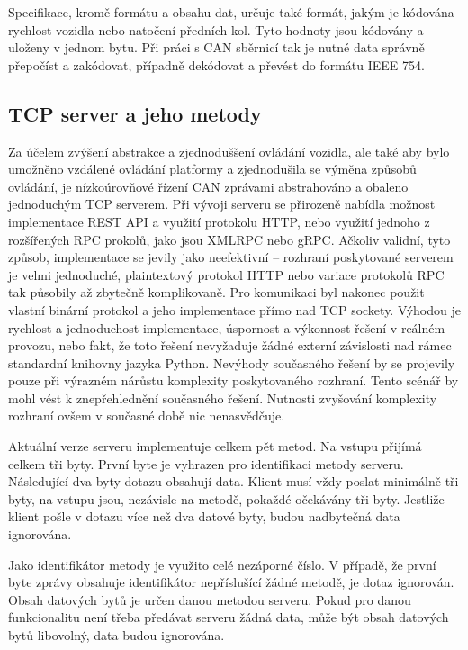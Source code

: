 \documentclass[czech,bachelor,dept460,male,cpp,cpdeclaration]{diploma}
\begin{document}
Specifikace, kromě formátu a obsahu dat, určuje také formát, jakým je kódována rychlost vozidla nebo natočení předních kol. Tyto
hodnoty jsou kódovány a uloženy v jednom bytu. Při práci s CAN sběrnicí tak je nutné data správně přepočíst a zakódovat, případně
dekódovat a převést do formátu IEEE 754.

\subsection{TCP server a jeho metody} \label{server-methods}

Za účelem zvýšení abstrakce a zjednoduššení ovládání vozidla, ale také aby bylo umožněno vzdálené ovládání platformy
a zjednodušila se výměna způsobů ovládání, je nízkoúrovňové řízení CAN zprávami abstrahováno a obaleno jednoduchým TCP serverem.
Při vývoji serveru se přirozeně nabídla možnost implementace REST API a využití protokolu HTTP, nebo využití jednoho z rozšířených
RPC prokolů, jako jsou XMLRPC nebo gRPC. Ačkoliv validní, tyto způsob, implementace se jevily jako neefektivní -- rozhraní 
poskytované serverem je velmi jednoduché, plaintextový protokol HTTP nebo variace protokolů RPC tak působily až zbytečně 
komplikovaně. Pro komunikaci byl nakonec použit vlastní binární protokol a jeho implementace přímo nad TCP sockety. 
Výhodou je rychlost a jednoduchost implementace, úspornost a výkonnost řešení v reálném provozu, nebo fakt, že toto řešení 
nevyžaduje žádné externí závislosti nad rámec standardní knihovny jazyka Python. Nevýhody současného řešení by se projevily 
pouze při výrazném nárůstu komplexity poskytovaného rozhraní. Tento scénář by mohl vést k znepřehlednění současného řešení. 
Nutnosti zvyšování komplexity rozhraní ovšem v současné době nic nenasvědčuje. 

Aktuální verze serveru implementuje celkem pět metod. Na vstupu přijímá celkem tři byty. První byte je vyhrazen pro identifikaci 
metody serveru. Následující dva byty dotazu obsahují data. Klient musí vždy poslat minimálně tři byty, na vstupu jsou, nezávisle
na metodě, pokaždé očekávány tři byty. Jestliže klient pošle v dotazu více než dva datové byty, budou nadbytečná data ignorována.

Jako identifikátor metody je využito celé nezáporné číslo. V případě, že první byte zprávy obsahuje identifikátor nepříslušící 
žádné metodě, je dotaz ignorován. Obsah datových bytů je určen danou metodou serveru. Pokud pro danou funkcionalitu není třeba 
předávat serveru žádná data, může být obsah datových bytů libovolný, data budou ignorována. 
\end{document}

